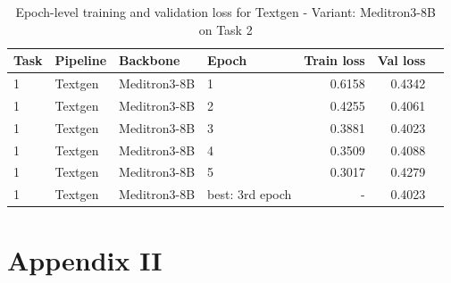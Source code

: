 \begin{table}[t]
    \centering
    \caption{Epoch-level training and validation loss for Textgen - Variant: Meditron3-8B on Task 2}
    \label{tab:epoch-summary-meditron3-8b-textgen-task2}
    \begin{tabular}{llllrrr}
        \toprule
        Task & Pipeline & Backbone & Epoch & Train loss & Val loss \\
        \midrule
        1 & Textgen & Meditron3-8B   & 1   & 0.6158 & 0.4342 \\
        1 & Textgen & Meditron3-8B   & 2 & 0.4255 & 0.4061 \\
        1 & Textgen & Meditron3-8B   & 3 & 0.3881 & 0.4023 \\
        1 & Textgen & Meditron3-8B   & 4 & 0.3509 & 0.4088 \\
        1 & Textgen & Meditron3-8B   & 5 & 0.3017 & 0.4279 \\
        \midrule
        1 & Textgen & Meditron3-8B   & best: 3rd epoch & - & 0.4023 \\
        \bottomrule
    \end{tabular}
\end{table}

\chapter{Appendix II}
\label{sec:appendix2}
